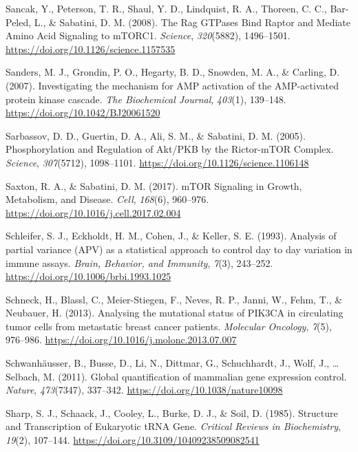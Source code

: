 \documentclass[12pt,openany]{book}
\begin{document}
\hypertarget{ref-Sancak2008}{}
Sancak, Y., Peterson, T. R., Shaul, Y. D., Lindquist, R. A., Thoreen, C.
C., Bar-Peled, L., \& Sabatini, D. M. (2008). The Rag GTPases Bind
Raptor and Mediate Amino Acid Signaling to mTORC1. \emph{Science},
\emph{320}(5882), 1496--1501.
\url{https://doi.org/10.1126/science.1157535}

\hypertarget{ref-Sanders2007}{}
Sanders, M. J., Grondin, P. O., Hegarty, B. D., Snowden, M. A., \&
Carling, D. (2007). Investigating the mechanism for AMP activation of
the AMP-activated protein kinase cascade. \emph{The Biochemical
Journal}, \emph{403}(1), 139--148.
\url{https://doi.org/10.1042/BJ20061520}

\hypertarget{ref-Sarbassov2005}{}
Sarbassov, D. D., Guertin, D. A., Ali, S. M., \& Sabatini, D. M. (2005).
Phosphorylation and Regulation of Akt/PKB by the Rictor-mTOR Complex.
\emph{Science}, \emph{307}(5712), 1098--1101.
\url{https://doi.org/10.1126/science.1106148}

\hypertarget{ref-Saxton2017}{}
Saxton, R. A., \& Sabatini, D. M. (2017). mTOR Signaling in Growth,
Metabolism, and Disease. \emph{Cell}, \emph{168}(6), 960--976.
\url{https://doi.org/10.1016/j.cell.2017.02.004}

\hypertarget{ref-Schleifer1993}{}
Schleifer, S. J., Eckholdt, H. M., Cohen, J., \& Keller, S. E. (1993).
Analysis of partial variance (APV) as a statistical approach to control
day to day variation in immune assays. \emph{Brain, Behavior, and
Immunity}, \emph{7}(3), 243--252.
\url{https://doi.org/10.1006/brbi.1993.1025}

\hypertarget{ref-Schneck2013}{}
Schneck, H., Blassl, C., Meier-Stiegen, F., Neves, R. P., Janni, W.,
Fehm, T., \& Neubauer, H. (2013). Analysing the mutational status of
PIK3CA in circulating tumor cells from metastatic breast cancer
patients. \emph{Molecular Oncology}, \emph{7}(5), 976--986.
\url{https://doi.org/10.1016/j.molonc.2013.07.007}

\hypertarget{ref-Schwanhausser2011}{}
Schwanhäusser, B., Busse, D., Li, N., Dittmar, G., Schuchhardt, J.,
Wolf, J., \ldots{} Selbach, M. (2011). Global quantification of
mammalian gene expression control. \emph{Nature}, \emph{473}(7347),
337--342. \url{https://doi.org/10.1038/nature10098}

\hypertarget{ref-Sharp1985}{}
Sharp, S. J., Schaack, J., Cooley, L., Burke, D. J., \& Soil, D. (1985).
Structure and Transcription of Eukaryotic tRNA Gene. \emph{Critical
Reviews in Biochemistry}, \emph{19}(2), 107--144.
\url{https://doi.org/10.3109/10409238509082541}
\end{document}

